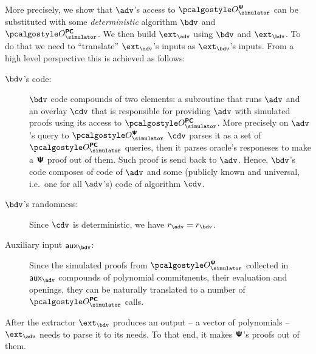 \documentclass[runningheads,11pt]{llncs}
\begin{document}
More precisely, we show that $\adv$'s access to $\oraclesps$ can be substituted
with some \emph{deterministic} algorithm $\bdv$ and $\oraclespcom$. We then
build $\ext_\adv$ using $\bdv$ and $\ext_\bdv$. To do that we need
to ``translate'' $\ext_\adv$'s inputs as $\ext_\bdv$'s inputs. From a high level
perspective this is achieved as follows:
\begin{description}
\item[$\bdv$'s code:] $\bdv$ code compounds of two elements: a subroutine that
  runs $\adv$ and an overlay $\cdv$ that is responsible for providing $\adv$ with
  simulated proofs using its access to $\oraclespcom$. More precisely on
  $\adv$'s query to $\oraclesps$ $\cdv$ parses it as a set of $\oraclespcom$
  queries, then it parses oracle's responeses to make a $\bm{\mathsf{\Psi}}$ proof out of
  them. Such proof is send back to $\adv$. Hence, $\bdv$'s code composes of code
  of $\adv$ and some (publicly known and universal, i.e.~one for all $\adv$'s)
  code of algorithm $\cdv$. 
\item[$\bdv$'s randomness:] Since $\cdv$ is deterministic, we have
  $r_\adv = r_\bdv$.
\item[Auxiliary input $\aux_\bdv$:] Since the simulated proofs from $\oraclesps$
  collected in $\aux_\adv$ compounds of polynomial commitments, their evaluation
  and openings, they can be naturally translated to a number of $\oraclespcom$
  calls.
\end{description}
After the extractor $\ext_\bdv$ produces an output -- a vector of polynomials --
$\ext_\adv$ needs to parse it to its needs. To that end, it makes $\bm{\mathsf{\Psi}}$'s proofs
out of them.
\end{document}
